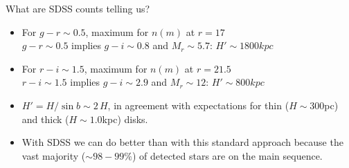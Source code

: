 \documentclass[letterpaper,landscape]{slides}
\begin{document}
\begin{slide}
\begin{center}
{\large \color{red}  What are SDSS counts telling us? }
\end{center}

\begin{itemize}
\item
{\color{blue} For $g-r\sim0.5$, maximum for $n(m)$ at $r=17$} \\
    $g-r\sim0.5$ implies $g-i\sim0.8$ and $M_r\sim5.7$: $H'\sim1800 kpc$
\item
{\color{blue} For $r-i\sim1.5$, maximum for $n(m)$ at $r=21.5$} \\
    $r-i\sim1.5$ implies $g-i\sim2.9$ and $M_r\sim12$: $H'\sim800 kpc$

\item
{\color{red} $H' = H/\sin{b} \sim 2\,H$,} in agreement with expectations
for thin ($H\sim300$pc) and thick ($H\sim1.0$kpc) disks.


\item
{\color{blue} With SDSS we can do better than with this standard approach
because {\color{red} the vast majority ($\sim98-99\%$) of detected stars
are on the main sequence.}}
\end{itemize}  
\vfill
\end{slide}
\end{document}
